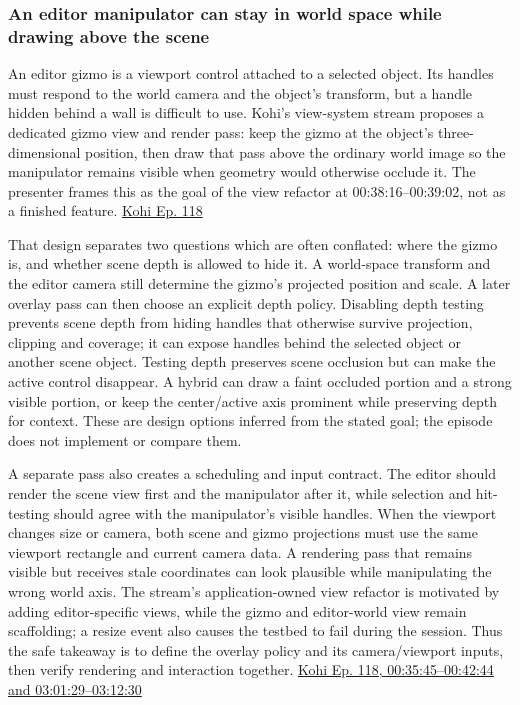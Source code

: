 \subsubsection{An editor manipulator can stay in world space while drawing above the scene}\label{06-engine-ii-ch032-an-editor-manipulator-can-stay-in-world-space-while-drawing-above-the-scene}

\hypertarget{06-engine-ii-ch032-an-editor-manipulator-can-stay-in-world-space-while-drawing-above-the-scene}{}

An editor gizmo is a viewport control attached to a selected object. Its handles must respond to the world camera and the object's transform, but a handle hidden behind a wall is difficult to use. Kohi's view-system stream proposes a dedicated gizmo view and render pass: keep the gizmo at the object's three-dimensional position, then draw that pass above the ordinary world image so the manipulator remains visible when geometry would otherwise occlude it. The presenter frames this as the goal of the view refactor at 00:38:16--00:39:02, not as a finished feature. \href{https://www.youtube.com/watch?v=CjJqa3iILAQ&t=2296s}{Kohi Ep. 118}

That design separates two questions which are often conflated: where the gizmo is, and whether scene depth is allowed to hide it. A world-space transform and the editor camera still determine the gizmo's projected position and scale. A later overlay pass can then choose an explicit depth policy. Disabling depth testing prevents scene depth from hiding handles that otherwise survive projection, clipping and coverage; it can expose handles behind the selected object or another scene object. Testing depth preserves scene occlusion but can make the active control disappear. A hybrid can draw a faint occluded portion and a strong visible portion, or keep the center/active axis prominent while preserving depth for context. These are design options inferred from the stated goal; the episode does not implement or compare them.

A separate pass also creates a scheduling and input contract. The editor should render the scene view first and the manipulator after it, while selection and hit-testing should agree with the manipulator's visible handles. When the viewport changes size or camera, both scene and gizmo projections must use the same viewport rectangle and current camera data. A rendering pass that remains visible but receives stale coordinates can look plausible while manipulating the wrong world axis. The stream's application-owned view refactor is motivated by adding editor-specific views, while the gizmo and editor-world view remain scaffolding; a resize event also causes the testbed to fail during the session. Thus the safe takeaway is to define the overlay policy and its camera/viewport inputs, then verify rendering and interaction together. \href{https://www.youtube.com/watch?v=CjJqa3iILAQ&t=2145s}{Kohi Ep. 118, 00:35:45--00:42:44 and 03:01:29--03:12:30}


